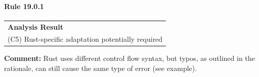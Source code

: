 \paragraph{Rule 19.0.1}
\begin{longtable}{p{13cm}}
\textbf{Analysis Result} \\
(C5) Rust-specific adaptation potentially required \\
\end{longtable}
\textbf{Comment:} Rust uses different control flow syntax, but typos, as outlined in the rationale, can still cause the same type of error (see example). \\


